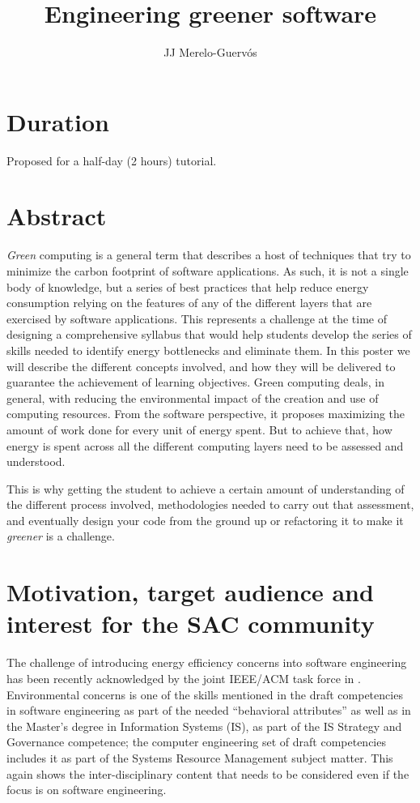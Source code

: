 \documentclass[a4paper]{article}
\begin{document}
\title{Engineering greener software}

\author{JJ Merelo-Guervós}


\maketitle

\section{Duration}

Proposed for a half-day (2 hours) tutorial.

\section{Abstract}

{\em Green} computing is a general term that describes a host of techniques that
try to minimize the carbon footprint of software applications. As such, it is
not a single body of knowledge, but a series of best practices that help reduce
energy consumption relying on the features of any of the different layers that
are exercised by software applications. This represents a challenge at the
time of designing a comprehensive syllabus that would help students develop the
series of skills needed to identify energy bottlenecks and eliminate them. In
this poster we will describe the different concepts involved, and how they will
be delivered to guarantee the achievement of learning objectives.
Green computing \cite{kurp2008green} deals, in general, with reducing the
environmental impact of the creation and use of computing resources. From the
software perspective, it proposes maximizing the amount of work done for every
unit of energy spent. But to achieve that, how energy is spent across
all the different computing layers need to be assessed and understood.

This is why getting the student to achieve a certain amount of understanding of
the different process involved, methodologies needed to carry out that
assessment, and eventually design your code from the ground up or refactoring it
to make it {\em greener} is a challenge.

\section{Motivation, target audience and interest for the SAC community}

The challenge of introducing energy efficiency concerns into software
engineering has been recently acknowledged by the joint IEEE/ACM task force in
\cite{cc2020}. Environmental concerns is one of the skills mentioned in the
draft competencies in software engineering as part of the needed ``behavioral
attributes'' as well as in the Master's degree in Information Systems (IS), as
part of the IS Strategy and Governance competence; the computer engineering set
of draft competencies includes it as part of the Systems Resource Management
subject matter. This again shows the inter-disciplinary content that needs to be
considered even if the focus is on software engineering.
\end{document}

